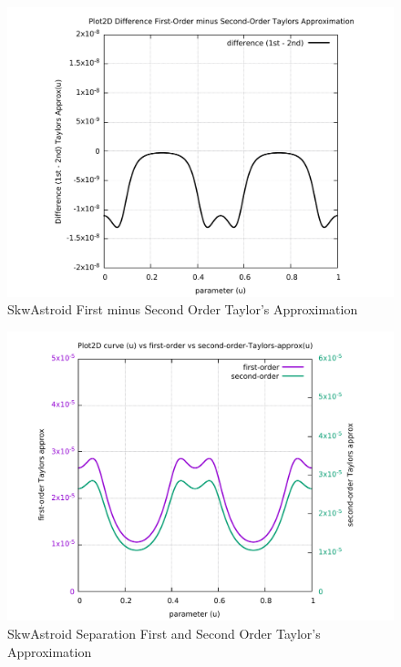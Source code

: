\begin{figure}
	\caption     {SkwAstroid First minus Second Order Taylor's Approximation}
	\label{06-img-SkwAstroid-First-minus-Second-Order-Taylors-Approx.pdf}
	\includegraphics[width=1.00\textwidth]{Chap4/appendix/app-SkwAstroid/plots/06-img-SkwAstroid-First-minus-Second-Order-Taylors-Approx.pdf}
\end{figure}

\clearpage
\pagebreak

\begin{figure}
	\caption     {SkwAstroid Separation First and Second Order Taylor's Approximation}
	\label{07-img-SkwAstroid-Separation-First-and-Second-Order-Taylors-Approx.pdf}
	\includegraphics[width=1.00\textwidth]{Chap4/appendix/app-SkwAstroid/plots/07-img-SkwAstroid-First-and-Second-Order-Taylors-Approx.pdf}
\end{figure}



